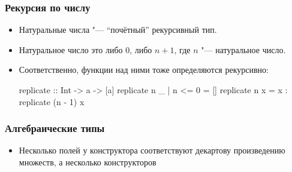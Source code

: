 \documentclass[10pt]{beamer}
\begin{document}
\begin{frame}[fragile]
  \frametitle{Рекурсия по числу}
  \begin{itemize}
    \item Натуральные числа "--- \enquote{почётный} рекурсивный тип.
          \pause
    \item Натуральное число это либо $0$, либо $n + 1$, где $n$ "--- натуральное число.
    \item Соответственно, функции над ними тоже определяются рекурсивно:
          \begin{haskell}
            replicate :: Int -> a -> [a]
            replicate n _ | n <= 0 = []
            replicate n x = x : replicate (n - 1) x
          \end{haskell}
  \end{itemize}
\end{frame}

\begin{frame}[fragile]
  \frametitle{Алгебраические типы}
  \begin{itemize}
    \item Несколько полей у конструктора соответствуют декартову произведению множеств, а несколько конструкторов
  \end{itemize}
\end{frame}
\end{document}

